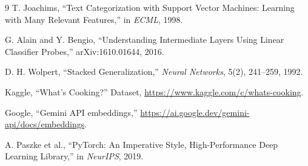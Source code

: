 \documentclass[11pt,letterpaper]{article}
\begin{document}
\begin{thebibliography}{9}
T. Joachims, ``Text Categorization with Support Vector Machines: Learning with Many Relevant Features,'' in \emph{ECML}, 1998.

G. Alain and Y. Bengio, ``Understanding Intermediate Layers Using Linear Classifier Probes,'' arXiv:1610.01644, 2016.

D. H. Wolpert, ``Stacked Generalization,'' \emph{Neural Networks}, 5(2), 241--259, 1992.

Kaggle, ``What's Cooking?'' Dataset, \url{https://www.kaggle.com/c/whats-cooking}.

Google, ``Gemini API embeddings,'' \url{https://ai.google.dev/gemini-api/docs/embeddings}.

A. Paszke et al., ``PyTorch: An Imperative Style, High-Performance Deep Learning Library,'' in \emph{NeurIPS}, 2019.
\end{thebibliography}
\end{document}
